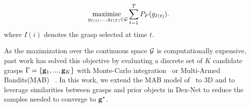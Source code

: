 \vspace{-2ex}
\begin{align}
	\underset{g_{I(1)}, ..., g_{I(T)} \in \mathcal{G}}{\text{maximize }} \sum \limits_{t=1}^T P_F(g_{I(t)}). \label{eq:objective}
\end{align}
\noindent where $I(i)$ denotes the grasp selected at time $t$.

As the maximization over the continuous space $\mathcal{G}$ is computationally expensive, past work has solved this objective by evaluating a discrete set of $K$ candidate grasps $\Gamma = \left\{ \mathbf{g}_1, ..., \mathbf{g}_K \right\}$ with Monte-Carlo integration~\cite{kehoe2012toward, weisz2012pose} or Multi-Armed Bandits(MAB) ~\cite{laskey2015bandits}.
In this work, we extend the MAB model of~\cite{laskey2015bandits} to 3D and to leverage similarities between grasps and prior objects in Dex-Net to reduce the samples needed to converge to $\mathbf{g}^*$.